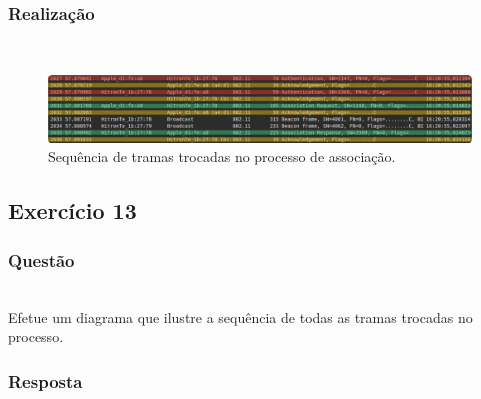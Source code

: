 \documentclass{llncs}
\begin{document}
\subsubsection{Realização}\rule[-10pt]{0pt}{10pt}\\

\begin{figure}
  \begin{center}
  \includegraphics[scale=0.35]{./imagens/assoc_seq.png} 
  \end{center}
  \caption{Sequência de tramas trocadas no processo de associação.}
  \label{fig:assoc_seq}
\end{figure}


\clearpage
\subsection{Exercício 13}
\subsubsection{Questão}\rule[-10pt]{0pt}{10pt}\\

Efetue um diagrama que ilustre a sequência de todas as tramas trocadas no processo.

\subsubsection{Resposta}\rule[-10pt]{0pt}{10pt}\\
\end{document}
